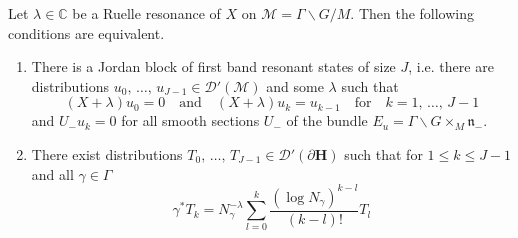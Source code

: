 \documentclass[AHL, Unicode, longabstracts, published]{cedram}
\newcommand{\mc}{\mathcal}
\newcommand{\cc}{\mathbb{C}}
\newcommand{\bfh}{\mathbf{H}}
\newcommand{\la}{\lambda}
\newcommand{\pl}{\partial}
\newcommand{\n}{\mathfrak n}
\begin{document}
\begin{prop}\label{prop:ruell_jordan_bv}
Let $\lambda\in \cc$ be a Ruelle resonance of $X$ on $\mc{M}=\Gamma\backslash G/M$. Then the following conditions are equivalent.
\begin{enumerate}
\item \label{list3.9.1}There is a Jordan block of first band resonant states of size $J$, i.e. there are distributions $u_0,\,\ldots,\,u_{J-1} \in \mc{D}'(\mc{M})$ and some $\la$ such that
\begin{equation}\label{relationJB}
(X+\lambda)u_0 = 0\quad\text{and}\quad(X + \lambda)u_k = u_{k-1}\quad\text{for}\quad k=1,\,\ldots,\,J-1
\end{equation}
and $U_- u_k=0$ for all smooth sections $U_-$ of the bundle $E_u=\Gamma\backslash G\times_M \n_-$.
\item \label{list3.9.2}There exist distributions $T_0,\,\ldots,\,T_{J-1}\in \mathcal D'(\pl{\bfh})$ such that for $1\leq k\leq J-1$ and all $\gamma\in \Gamma$
\begin{equation}\label{eq:T_k_transformation}
\gamma^* T_k = N_\gamma^{-\lambda}\sum_{l=0}^k\frac{(\log N_\gamma)^{k-l}}{(k-l)!}T_{l}
\end{equation}
\end{enumerate}
\end{prop}
\end{document}
